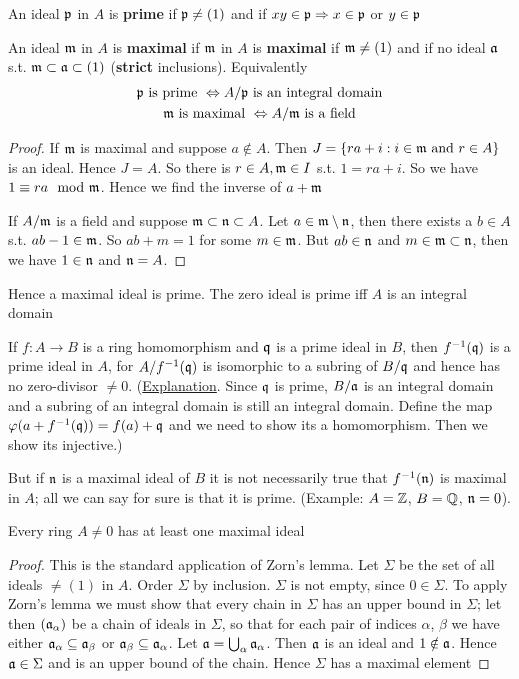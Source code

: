 \documentclass[11pt]{article}
\begin{document}
An ideal \(\mathfrak{p}\) in \(A\) is \textbf{prime} if \(\mathfrak{p}\neq(1)\) and if \(xy\in\mathfrak{p}\Rightarrow x\in\mathfrak{p}\) or \(y\in\mathfrak{p}\)

An ideal \(\mathfrak{m}\) in \(A\) is \textbf{maximal} if \(\mathfrak{m}\) in \(A\) is \textbf{maximal} if \(\mathfrak{m}\neq(1)\) and if no
ideal \(\mathfrak{a}\) s.t. \(\mathfrak{m}\subset\mathfrak{a}\subset(1)\) (\textbf{strict} inclusions). Equivalently
\begin{gather*}
\mathfrak{p}\text{ is prime } \Leftrightarrow A/\mathfrak{p}\text{ is an integral domain}\\
\mathfrak{m}\text{ is maximal } \Leftrightarrow A/\mathfrak{m}\text{ is a field}
\end{gather*}
\begin{proof}
If \(\mathfrak{m}\) is maximal and suppose \(a\notin A\). Then \(J=\{ra+i:i\in \mathfrak{m}\text{ and }r\in A\}\) is an ideal.
Hence \(J=A\). So there is \(r\in A, \mathfrak{m}\in I\) s.t. \(1=ra+i\). So we have \(1\equiv ra\mod {\mathfrak{m}}\). Hence we
find the inverse of \(a+\mathfrak{m}\)

If \(A/\mathfrak{m}\) is a field and suppose \(\mathfrak{m}\subset\mathfrak{n}\subset A\). Let \(a\in\mathfrak{m}\setminus\mathfrak{n}\), then there exists a \(b\in A\)
s.t. \(ab-1\in\mathfrak{m}\). So \(ab+m=1\) for some \(m\in\mathfrak{m}\). But \(ab\in\mathfrak{n}\) and \(m\in\mathfrak{m}\subset\mathfrak{n}\), then we
have \(1\in\mathfrak{n}\) and \(\mathfrak{n}=A\).
\end{proof}

Hence a maximal ideal is prime. The zero ideal is prime iff \(A\) is an integral domain

If \(f:A\to B\) is a ring homomorphism and \(\mathfrak{q}\) is a prime ideal in \(B\), then \(f^{-1}(\mathfrak{q})\) is
a prime ideal in \(A\), for \(A/f^{-1}(\mathfrak{q})\) is isomorphic to a subring of \(B/\mathfrak{q}\) and hence has
no zero-divisor \(\neq 0\). (\href{https://asgarli.wordpress.com/2013/04/21/inverse-image-of-a-prime-ideal-is-prime/}{Explanation}. Since \(\mathfrak{q}\) is prime, \(B/\mathfrak{a}\) is an integral domain and a
subring of an integral domain is still an integral domain. Define the map
\(\varphi(a+f^{-1}(\mathfrak{q}))=f(a)+\mathfrak{q}\) and we need to show its a homomorphism. Then we show its injective.)

But if \(\mathfrak{n}\) is a maximal ideal of \(B\) it is not necessarily true that \(f^{-1}(\mathfrak{n})\) is
maximal in \(A\); all we can say for sure is that it is prime. (Example: \(A=\mathbb{Z}\), \(B=\mathbb{Q}\), \(\mathfrak{n}=0\)).

\begin{theorem}[]
\label{1.3}
Every ring \(A\neq 0\) has at least one maximal ideal
\end{theorem}

\begin{proof}
This is the standard application of Zorn's lemma. Let \(\Sigma\) be the set of all ideals \(\neq(1)\)
in \(A\). Order \(\Sigma\) by inclusion. \(\Sigma\) is not empty, since \(0\in\Sigma\). To apply Zorn's lemma we must
show that every chain in \(\Sigma\) has an upper bound in \(\Sigma\); let then \((\mathfrak{a}_\alpha)\) be a chain of ideals in
\(\Sigma\), so that for each pair of indices \(\alpha\), \(\beta\) we have either \(\mathfrak{a}_\alpha\subseteq \mathfrak{a}_\beta\) or \(\mathfrak{a}_\beta\subseteq\mathfrak{a}_\alpha\).
Let \(\mathfrak{a}=\bigcup_\alpha\mathfrak{a}_\alpha\). Then \(\mathfrak{a}\) is an ideal and \(1\notin\mathfrak{a}\). Hence \(\mathfrak{a}\in\Sigma\) and is an upper bound of the
chain. Hence \(\Sigma\) has a maximal element
\end{proof}
\end{document}
